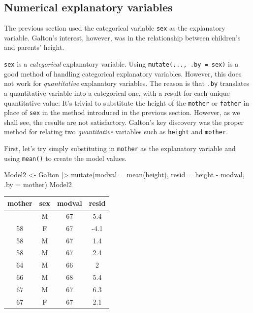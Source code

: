 \documentclass[
  letterpaper,
  DIV=11,
  numbers=noendperiod,
  oneside]{scrartcl}
\newenvironment{Shaded}{\begin{snugshade}}{\end{snugshade}}
\newcommand{\AttributeTok}[1]{\textcolor[rgb]{0.40,0.45,0.13}{#1}}
\newcommand{\FunctionTok}[1]{\textcolor[rgb]{0.28,0.35,0.67}{#1}}
\newcommand{\NormalTok}[1]{\textcolor[rgb]{0.00,0.23,0.31}{#1}}
\newcommand{\OtherTok}[1]{\textcolor[rgb]{0.00,0.23,0.31}{#1}}
\newcommand{\SpecialCharTok}[1]{\textcolor[rgb]{0.37,0.37,0.37}{#1}}
\begin{document}
\subsection{Numerical explanatory
variables}\label{numerical-explanatory-variables}

The previous section used the categorical variable \texttt{sex} as the
explanatory variable. Galton's interest, however, was in the
relationship between children's and parents' height.

\texttt{sex} is a \emph{categorical} explanatory variable. Using
\texttt{mutate(...,\ .by\ =\ sex)} is a good method of handling
categorical explanatory variables. However, this does not work for
\emph{quantitative} explanatory variables. The reason is that
\texttt{.by} translates a quantitative variable into a categorical one,
with a result for each unique quantitative value: It's trivial to
substitute the height of the \texttt{mother} or \texttt{father} in place
of \texttt{sex} in the method introduced in the previous section.
However, as we shall see, the results are not satisfactory. Galton's key
discovery was the proper method for relating two \emph{quantitative}
variables such as \texttt{height} and \texttt{mother}.

First, let's try simply substituting in \texttt{mother} as the
explanatory variable and using \texttt{mean()} to create the model
values.

\begin{Shaded}
\begin{Highlighting}[]
\NormalTok{Model2 }\OtherTok{\textless{}{-}}\NormalTok{ Galton }\SpecialCharTok{|\textgreater{}}
  \FunctionTok{mutate}\NormalTok{(}\AttributeTok{modval =} \FunctionTok{mean}\NormalTok{(height),}
         \AttributeTok{resid =}\NormalTok{ height }\SpecialCharTok{{-}}\NormalTok{ modval,}
         \AttributeTok{.by =}\NormalTok{ mother) }
\NormalTok{Model2}
\end{Highlighting}
\end{Shaded}

\begin{longtable}[]{@{}cccc@{}}
\toprule\noalign{}
mother & sex & modval & resid \\
\midrule\noalign{}
\endhead
\bottomrule\noalign{}
\endlastfoot
58 & M & 67 & 5.4 \\
58 & F & 67 & -4.1 \\
58 & M & 67 & 1.4 \\
58 & M & 67 & 2.4 \\
64 & M & 66 & 2 \\
66 & M & 68 & 5.4 \\
67 & M & 67 & 6.3 \\
67 & F & 67 & 2.1 \\
\end{longtable}
\end{document}
